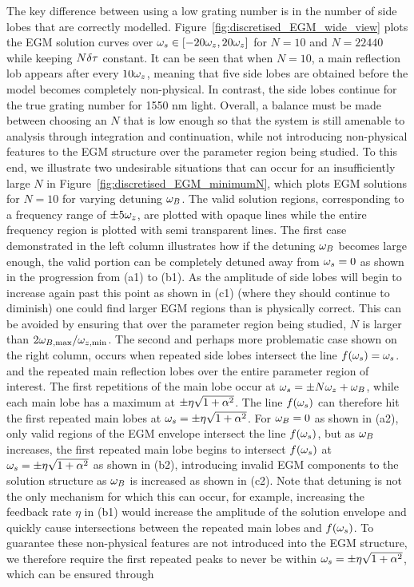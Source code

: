 %
The key difference between using a low grating number is in the number of side lobes that are correctly modelled. Figure~\ref{fig:discretised_EGM_wide_view} plots the EGM solution curves over $\omega_s \in [-20\omega_z, 20\omega_z]$ for $N = 10$ and $N = 22440$ while keeping $N\delta \tau$ constant. It can be seen that when $N=10$, a main reflection lob appears after every $10\omega_z$, meaning that five side lobes are obtained before the model becomes completely non-physical. In contrast, the side lobes continue for the true grating number for 1550 nm light. Overall, a balance must be made between choosing an $N$ that is low enough so that the system is still amenable to analysis through integration and continuation, while not introducing non-physical features to the EGM structure over the parameter region being studied. To this end, we illustrate two undesirable situations that can occur for an insufficiently large $N$ in Figure~\ref{fig:discretised_EGM_minimumN}, which plots EGM solutions for $N=10$ for varying detuning $\omega_B$. The valid solution regions, corresponding to a frequency range of $\pm 5 \omega_z$, are plotted with opaque lines while the entire frequency region is plotted with semi transparent lines. The first case demonstrated in the left column illustrates how if the detuning $\omega_B$ becomes large enough, the valid portion can be completely detuned away from $\omega_s=0$ as shown in the progression from (a1) to (b1). As the amplitude of side lobes will begin to increase again past this point as shown in (c1) (where they should continue to diminish) one could find larger EGM regions than is physically correct. This can be avoided by ensuring that over the parameter region being studied, $N$ is larger than $2{\omega}_{B, \max}/{\omega}_{z,\min}$. The second and perhaps more problematic case shown on the right column, occurs when repeated side lobes intersect the line $f(\omega_s) = \omega_s$. and the repeated main reflection lobes over the entire parameter region of interest. The first repetitions of the main lobe occur at $\omega_s = \pm N \omega_z + \omega_B$, while each main lobe has a maximum at $\pm \eta \sqrt{1+\alpha^2}$. The line $f(\omega_s)$ can therefore hit the first repeated main lobes at $\omega_s = \pm \eta \sqrt{1+\alpha^2}$. For $\omega_B=0$ as shown in (a2), only valid regions of the EGM envelope intersect the line $f(\omega_s)$, but as $\omega_B$ increases, the first repeated main lobe begins to intersect $f(\omega_s)$ at $\omega_s = \pm \eta \sqrt{1+\alpha^2}$ as shown in (b2), introducing invalid EGM components to the solution structure as $\omega_B$ is increased as shown in (c2). Note that detuning is not the only mechanism for which this can occur, for example, increasing the feedback rate $\eta$ in (b1) would increase the amplitude of the solution envelope and quickly cause intersections between the repeated main lobes and $f(\omega_s)$. To guarantee these non-physical features are not introduced into the EGM structure, we therefore require the first repeated peaks to never be within $\omega_s = \pm \eta \sqrt{1+\alpha^2}$, which can be ensured through
